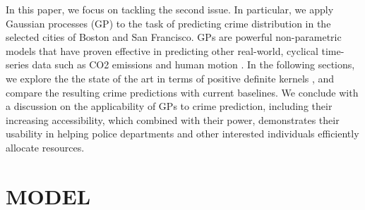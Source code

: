 \documentclass[letterpaper, 11 pt, conference]{ieeeconf}  %
\begin{document}
In this paper, we focus on tackling the second issue. In particular, we apply Gaussian processes (GP) to the task of predicting crime distribution in the selected cities of Boston and San Francisco. GPs are powerful non-parametric models that have proven effective in predicting other real-world, cyclical time-series data such as CO2 emissions and human motion \cite{gaussian_models}. In the following sections, we explore the the state of the art in terms of positive definite kernels \cite{kernel_methods}, and compare the resulting crime predictions with current baselines. We conclude with a discussion on the applicability of GPs to crime prediction, including their increasing accessibility, which combined with their power, demonstrates their usability in helping police departments and other interested individuals efficiently allocate resources.  
 
\section{MODEL}
\end{document}
